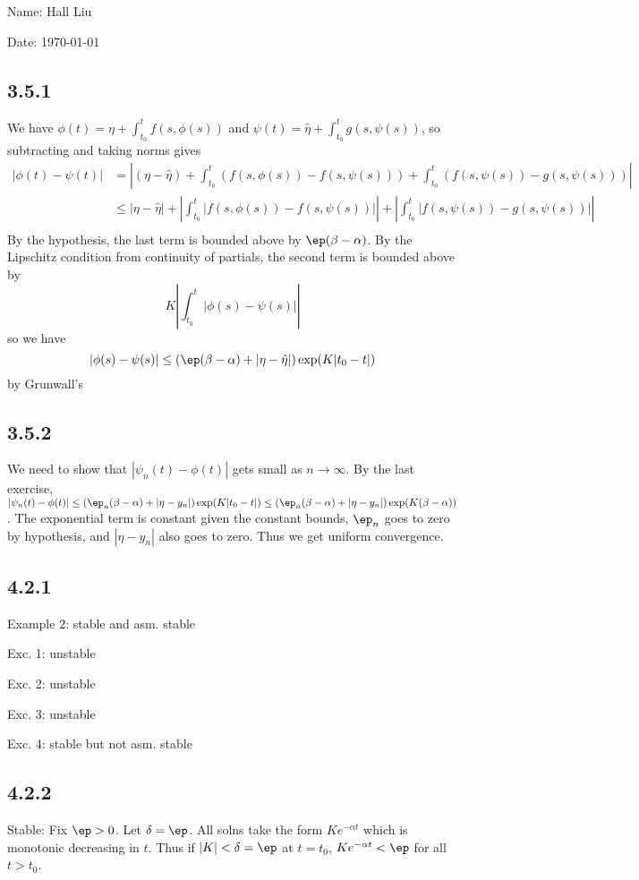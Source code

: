 \documentclass{article}
\begin{document}
Name: Hall Liu

Date: \today 
\vspace{1.5cm}
\subsection*{3.5.1}
We have $\phi(t)=\eta+\int_{t_0}^tf(s,\phi(s))$ and $\psi(t)=\hat{\eta}+\int_{t_0}^tg(s,\psi(s))$, so subtracting and taking norms gives
\begin{align*}
|\phi(t)-\psi(t)|&=\left|(\eta-\hat{\eta})+\int_{t_0}^t(f(s,\phi(s))-f(s,\psi(s)))+\int_{t_0}^t(f(s,\psi(s))-g(s,\psi(s)))\right|\\
&\leq|\eta-\hat{\eta}|+\left|\int_{t_0}^t|f(s,\phi(s))-f(s,\psi(s))|\right|+\left|\int_{t_0}^t|f(s,\psi(s))-g(s,\psi(s))|\right|\\
\end{align*}
By the hypothesis, the last term is bounded above by $\ep(\beta-\alpha)$. By the Lipschitz condition from continuity of partials, the second term is bounded above by 
$$K\left|\int_{t_0}^t|\phi(s)-\psi(s)|\right|$$
so we have
$$|\phi(s)-\psi(s)|\leq(\ep(\beta-\alpha)+|\eta-\hat{\eta}|)\exp(K|t_0-t|)$$
by Grunwall's
\subsection*{3.5.2}
We need to show that $|\psi_n(t)-\phi(t)|$ gets small as $n\to\infty$. By the last exercise, $|\psi_n(t)-\phi(t)|\leq(\ep_n(\beta-\alpha)+|\eta-y_n|)\exp(K|t_0-t|)\leq(\ep_n(\beta-\alpha)+|\eta-y_n|)\exp(K(\beta-\alpha))$. The exponential term is constant given the constant bounds, $\ep_n$ goes to zero by hypothesis, and $|\eta-y_n|$ also goes to zero. Thus we get uniform convergence.
\subsection*{4.2.1}
Example 2: stable and asm. stable

Exc. 1: unstable

Exc. 2: unstable

Exc. 3: unstable

Exc. 4: stable but not asm. stable
\subsection*{4.2.2}
Stable: Fix $\ep>0$. Let $\delta=\ep$. All solns take the form $Ke^{-\alpha t}$ which is monotonic decreasing in $t$. Thus if $|K|<\delta=\ep$ at $t=t_0$, $Ke^{-\alpha t}<\ep$ for all $t>t_0$.
\end{document}
